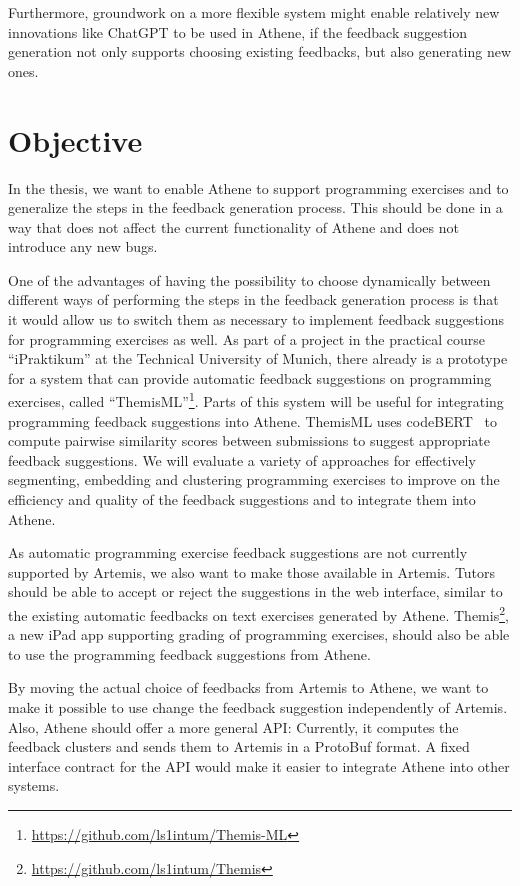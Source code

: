 Furthermore, groundwork on a more flexible system might enable relatively new innovations like ChatGPT to be used in Athene, if the feedback suggestion generation not only supports choosing existing feedbacks, but also generating new ones.

\section*{Objective}
In the thesis, we want to enable Athene to support programming exercises and to generalize the steps in the feedback generation process. This should be done in a way that does not affect the current functionality of Athene and does not introduce any new bugs.

One of the advantages of having the possibility to choose dynamically between different ways of performing the steps in the feedback generation process is that it would allow us to switch them as necessary to implement feedback suggestions for programming exercises as well. 
As part of a project in the practical course \enquote{iPraktikum} at the Technical University of Munich, there already is a prototype for a system that can provide automatic feedback suggestions on programming exercises, called \enquote{ThemisML}\footnote{\url{https://github.com/ls1intum/Themis-ML}}. 
Parts of this system will be useful for integrating programming feedback suggestions into Athene. ThemisML uses codeBERT~\cite{codeBERT} to compute pairwise similarity scores between submissions to suggest appropriate feedback suggestions. We will evaluate a variety of approaches for effectively segmenting, embedding and clustering programming exercises to improve on the efficiency and quality of the feedback suggestions and to integrate them into Athene.

As automatic programming exercise feedback suggestions are not currently supported by Artemis, we also want to make those available in Artemis. Tutors should be able to accept or reject the suggestions in the web interface, similar to the existing automatic feedbacks on text exercises generated by Athene. Themis\footnote{\url{https://github.com/ls1intum/Themis}}, a new iPad app supporting grading of programming exercises, should also be able to use the programming feedback suggestions from Athene.

By moving the actual choice of feedbacks from Artemis to Athene, we want to make it possible to use change the feedback suggestion independently of Artemis. Also, Athene should offer a more general API: Currently, it computes the feedback clusters and sends them to Artemis in a ProtoBuf format. A fixed interface contract for the API would make it easier to integrate Athene into other systems.


